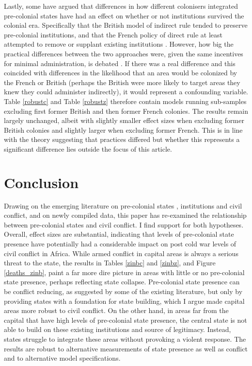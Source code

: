 \documentclass[12pt]{article}
\begin{document}
Lastly, some have argued that differences in how different colonisers integrated
pre-colonial states have had an effect on whether or not institutions survived
the colonial era. Specifically that the British model of indirect rule tended to
preserve pre-colonial institutions, and that the French policy of direct rule at
least attempted to remove or supplant existing institutions \citep{Paine2019}.
However, how big the practical differences between the two approaches were,
given the same incentives for minimal administration, is debated
\citep{boone2014property, englebert2013inside}. If there was a real difference
and this coincided with differences in the likelihood that an area would be
colonized by the French or British (perhaps the British were more likely to
target areas they knew they could administer indirectly), it would represent a
confounding variable. Table \ref{robustc} and Table \ref{robustz} therefore
contain models running sub-samples excluding first former British and then
former French colonies. The results remain largely unchanged, albeit with
slightly smaller effect sizes when excluding former British colonies and
slightly larger when excluding former French. This is in line with the theory
suggesting that practices differed but whether this represents a significant
difference lies outside the focus of this article.

\section{Conclusion} \label{Conclusion}

Drawing on the emerging literature on pre-colonial states \citep{Paine2019,
Depetris-Chauvin2016}, institutions \citep{Wig2016, Englebert2002,
Michalopoulos2018} and civil conflict, and on newly compiled data, this paper
has re-examined the relationship between pre-colonial states and civil conflict.
I find support for both hypotheses. Overall, effect sizes are substantial,
indicating that levels of pre-colonial state presence have potentially had a
considerable impact on post cold war levels of civil conflict in Africa. While
armed conflict in capital areas is always a serious threat to the state, the
results in Tables \ref{zinbc} and \ref{zinbz}, and Figure \ref{deaths_zinb},
paint a far more dire picture in areas with little or no pre-colonial state
presence, perhaps reflecting state collapse. Pre-colonial state presence can be
conflict reducing, as suggested by some of the existing literature, but only by
providing states with a foundation for state building, which I argue made
capital areas more robust to civil conflict. On the other hand, in areas far
from the capital that have high levels of pre-colonial state presence, the
central state is not able to build on these existing institutions and source of
legitimacy. Instead, states struggle to integrate these areas without provoking
a violent response. The results are robust to alternative measurements of state
presence as well as conflict and to alternative model specifications.
\end{document}
